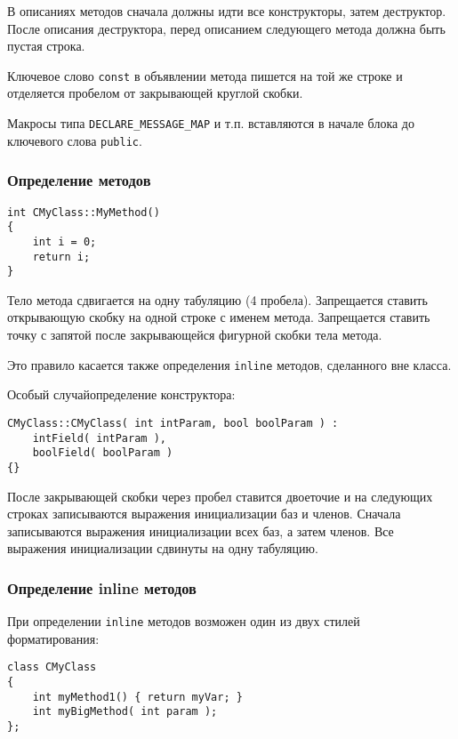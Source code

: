 В описаниях методов сначала должны идти все конструкторы, затем деструктор. После описания деструктора, перед описанием следующего метода должна быть пустая строка.

Ключевое слово \lstinline|const| в объявлении метода пишется на той же строке и отделяется пробелом от закрывающей круглой скобки.

Макросы типа \lstinline|DECLARE_MESSAGE_MAP| и т.п. вставляются в начале блока до ключевого слова \lstinline|public|.

\subsubsection{Определение методов}

\begin{lstlisting}[frame=single]
int CMyClass::MyMethod()
{
    int i = 0;
    return i;
}
\end{lstlisting}

Тело метода сдвигается на одну табуляцию (4 пробела). Запрещается ставить открывающую скобку на одной строке с именем метода. Запрещается ставить точку с запятой после закрывающейся фигурной скобки тела метода.

Это правило касается также определения \lstinline|inline| методов, сделанного вне класса.

Особый случай\mdash определение конструктора:

\begin{lstlisting}[frame=single]
CMyClass::CMyClass( int intParam, bool boolParam ) :
    intField( intParam ),
    boolField( boolParam )
{}
\end{lstlisting}

После закрывающей скобки через пробел ставится двоеточие и на следующих строках записываются выражения инициализации баз и членов. Сначала записываются выражения инициализации всех баз, а затем членов. Все выражения инициализации сдвинуты на одну табуляцию.

\subsubsection{Определение inline методов}

При определении \lstinline|inline| методов возможен один из двух стилей форматирования:

\begin{lstlisting}[frame=single]
class СMyClass
{
    int myMethod1() { return myVar; }
    int myBigMethod( int param );
};
\end{lstlisting}

